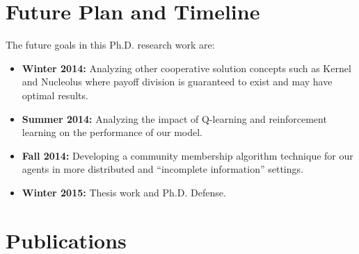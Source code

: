 \section {Future Plan and Timeline}

\indent The future goals in this Ph.D. research work are:

\begin{itemize}
\item \textbf{Winter 2014: }Analyzing other cooperative solution concepts such as Kernel
and Nucleolus where payoff division is guaranteed to exist and may
have optimal results.

\item \textbf{Summer 2014: }Analyzing the impact of Q-learning and reinforcement
learning on the performance of our model.

\item \textbf{Fall 2014: }Developing a community membership algorithm technique for
our agents in more distributed and ``incomplete information'' settings.

\item \textbf{Winter 2015: }Thesis work and Ph.D. Defense.
\end{itemize}




\section {Publications }

